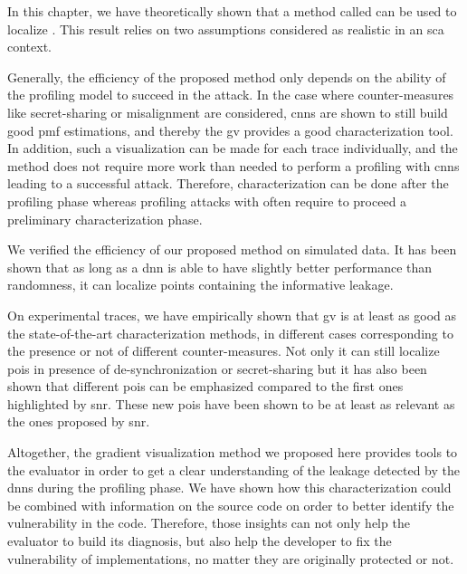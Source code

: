 In this chapter, we have theoretically shown that a method called  can be used to localize .
This result relies on two assumptions considered as realistic in an \gls{sca} context. 


Generally, the efficiency of the proposed method only depends on the ability of the profiling model to succeed in the attack.
In the case where counter-measures like secret-sharing or misalignment are considered, \glspl{cnn} are shown to still build good \gls{pmf} estimations, and thereby the \gls{gv} provides a good characterization tool.
In addition, such a visualization can be made for each trace individually, and the method does not require more work than needed to perform a profiling with \glspl{cnn} leading to a successful attack.
Therefore, characterization can be done after the profiling phase whereas profiling attacks with  often require to proceed a preliminary characterization phase.

We verified the efficiency of our proposed method on simulated data.
It has been shown that as long as a \gls{dnn} is able to have slightly better performance than randomness, it can localize points containing the informative leakage. 

On experimental traces, we have empirically shown that \gls{gv} is at least as good as the state-of-the-art characterization methods, in different cases corresponding to the presence or not of different counter-measures.
Not only it can still localize \glspl{poi} in presence of de-synchronization or secret-sharing but it has also been shown that different \glspl{poi} can be emphasized compared to the first ones highlighted by \gls{snr}.
These new \glspl{poi} have been shown to be at least as relevant as the ones proposed by \gls{snr}.

Altogether, the gradient visualization method we proposed here provides tools to the evaluator in order to get a clear understanding of the leakage detected by the \glspl{dnn} during the profiling phase.
We have shown how this characterization could be combined with information on the source code on order to better identify the vulnerability in the code.
Therefore, those insights can not only help the evaluator to build its diagnosis, but also help the developer to fix the vulnerability of implementations, no matter they are originally protected or not.